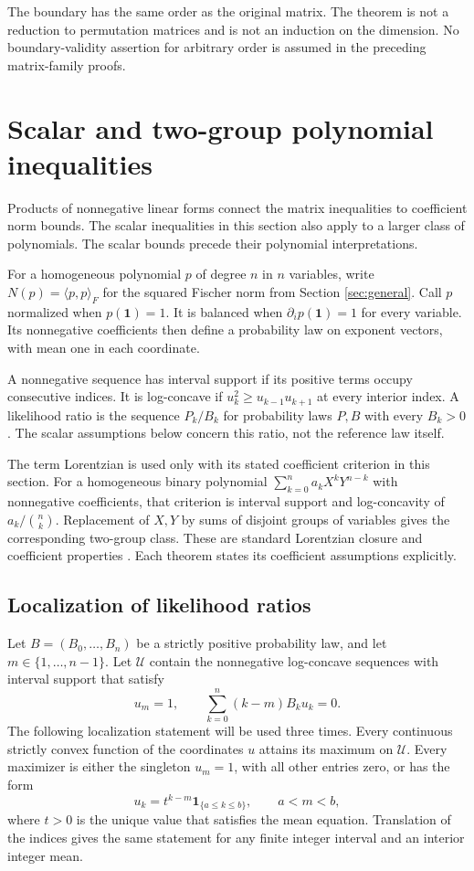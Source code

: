 \documentclass[11pt,a4paper]{article}
\theoremstyle{definition}
\theoremstyle{remark}
\begin{document}
The boundary has the same order as the original matrix.
The theorem is not a reduction to permutation matrices and is not an induction on the dimension.
No boundary-validity assertion for arbitrary order is assumed in the preceding matrix-family proofs.


\section{Scalar and two-group polynomial
inequalities}\label{sec:scalar}

Products of nonnegative linear forms connect the matrix inequalities to coefficient norm bounds.
The scalar inequalities in this section also apply to a larger class of polynomials.
The scalar bounds precede their polynomial interpretations.

For a homogeneous polynomial \(p\) of degree \(n\) in \(n\) variables,
write \(N(p)=\langle p,p\rangle_F\) for the squared Fischer norm
from Section \ref{sec:general}. Call \(p\) normalized when
\(p(\mathbf1)=1\). It is balanced when \(\partial_i p(\mathbf1)=1\) for
every variable. Its nonnegative coefficients then define a probability
law on exponent vectors, with mean one in each coordinate.

A nonnegative sequence has interval support if its positive terms occupy
consecutive indices. It is log-concave if \(u_k^2\ge u_{k-1}u_{k+1}\) at
every interior index. A likelihood ratio is the sequence \(P_k/B_k\) for
probability laws \(P,B\) with every \(B_k>0\). The scalar assumptions
below concern this ratio, not the reference law itself.

The term Lorentzian is used only with its stated coefficient criterion
in this section. For a homogeneous binary polynomial
\(\sum_{k=0}^n a_kX^kY^{n-k}\) with nonnegative coefficients, that
criterion is interval support and log-concavity of \(a_k/\binom nk\).
Replacement of \(X,Y\) by sums of disjoint groups of variables gives the
corresponding two-group class. These are standard Lorentzian closure and
coefficient properties \cite{brandenhuh2020}. Each theorem states its coefficient assumptions explicitly.

\subsection{Localization of likelihood
ratios}\label{scalar-localization-of-likelihood-ratios}

Let \(B=(B_0,\ldots,B_n)\) be a strictly positive probability law, and
let \(m\in\{1,\ldots,n-1\}\). Let \(\mathcal U\) contain the nonnegative
log-concave sequences with interval support that satisfy \[
 u_m=1,\qquad \sum_{k=0}^n(k-m)B_ku_k=0.
\] The following localization statement will be used three times. Every
continuous strictly convex function of the coordinates \(u\) attains its
maximum on \(\mathcal U\). Every maximizer is either the singleton
\(u_m=1\), with all other entries zero, or has the form \[
 u_k=t^{k-m}\mathbf1_{\{a\le k\le b\}},\qquad a<m<b,
\] where \(t>0\) is the unique value that satisfies the mean equation.
Translation of the indices gives the same statement for any finite
integer interval and an interior integer mean.
\end{document}
